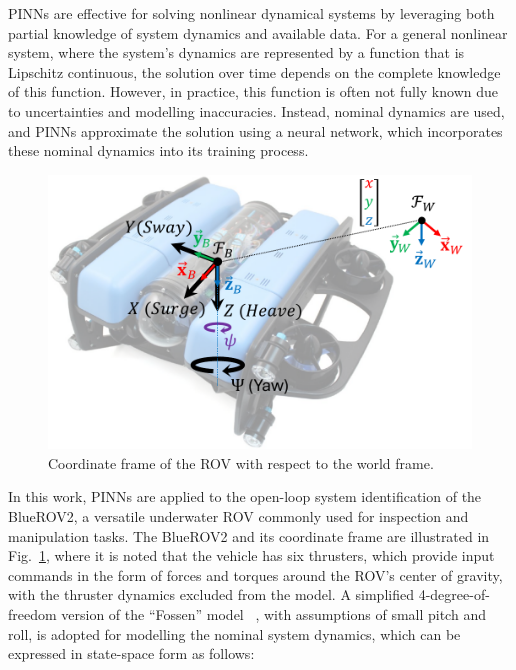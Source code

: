 PINNs are effective for solving nonlinear dynamical systems by leveraging both partial knowledge of system dynamics and available data. For a general nonlinear system, where the system’s dynamics are represented by a function that is Lipschitz continuous, the solution over time depends on the complete knowledge of this function. However, in practice, this function is often not fully known due to uncertainties and modelling inaccuracies. Instead, nominal dynamics are used, and PINNs approximate the solution using a neural network, which incorporates these nominal dynamics into its training process. %
%
\begin{figure}[b!]
    \centering
    \includegraphics[width=0.55\columnwidth]{Phd_thesis/figures/rov_new.pdf}
    \caption{Coordinate frame of the ROV with respect to the world frame.}
    \label{fig:rov-coord-frame}
\end{figure}
%
In this work, PINNs are applied to the open-loop system identification of the BlueROV2, a versatile underwater ROV commonly used for inspection and manipulation tasks. The BlueROV2 and its coordinate frame are illustrated in Fig.~\ref{fig:rov-coord-frame}, where it is noted that the vehicle has six thrusters, which provide input commands in the form of forces and torques around the ROV's center of gravity, with the thruster dynamics excluded from the model. A simplified 4-degree-of-freedom version of the “Fossen” model ~\cite{fossen}, with assumptions of small pitch and roll, is adopted for modelling the nominal system dynamics, which can be expressed in state-space form as follows:
